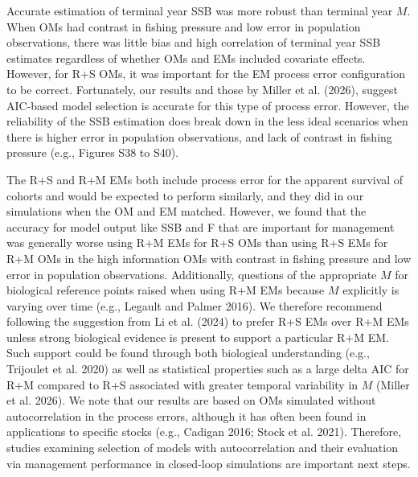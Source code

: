 \documentclass[
  12pt,
]{article}
\begin{document}
Accurate estimation of terminal year SSB was more robust than terminal
year \(M\). When OMs had contrast in fishing pressure and low error in
population observations, there was little bias and high correlation of
terminal year SSB estimates regardless of whether OMs and EMs included
covariate effects. However, for R+S OMs, it was important for the EM
process error configuration to be correct. Fortunately, our results and
those by Miller et al. (2026), suggest AIC-based model selection is
accurate for this type of process error. However, the reliability of the
SSB estimation does break down in the less ideal scenarios when there is
higher error in population observations, and lack of contrast in fishing
pressure (e.g., Figures S38 to S40).

The R+S and R+M EMs both include process error for the apparent survival
of cohorts and would be expected to perform similarly, and they did in
our simulations when the OM and EM matched. However, we found that the
accuracy for model output like SSB and F that are important for
management was generally worse using R+M EMs for R+S OMs than using R+S
EMs for R+M OMs in the high information OMs with contrast in fishing
pressure and low error in population observations. Additionally,
questions of the appropriate \(M\) for biological reference points
raised when using R+M EMs because \(M\) explicitly is varying over time
(e.g., Legault and Palmer 2016). We therefore recommend following the
suggestion from Li et al. (2024) to prefer R+S EMs over R+M EMs unless
strong biological evidence is present to support a particular R+M EM.
Such support could be found through both biological understanding (e.g.,
Trijoulet et al. 2020) as well as statistical properties such as a large
delta AIC for R+M compared to R+S associated with greater temporal
variability in \(M\) (Miller et al. 2026). We note that our results are
based on OMs simulated without autocorrelation in the process errors,
although it has often been found in applications to specific stocks
(e.g., Cadigan 2016; Stock et al. 2021). Therefore, studies examining
selection of models with autocorrelation and their evaluation via
management performance in closed-loop simulations are important next
steps.
\end{document}
